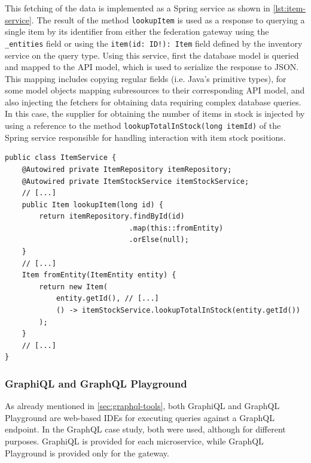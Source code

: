 This fetching of the data is implemented as a Spring service as shown in \autoref{lst:item-service}.
The result of the method \texttt{lookupItem} is used as a response to querying a single item by its identifier from either the federation gateway using the \texttt{\_entities} field or using the \texttt{item(id: ID!): Item} field defined by the inventory service on the query type.
Using this service, first the database model is queried and mapped to the \ac{API} model, which is used to serialize the response to \ac{JSON}.
This mapping includes copying regular fields (i.e. Java's primitive types), for some model objects mapping subresources to their corresponding \ac{API} model, and also injecting the fetchers for obtaining data requiring complex database queries.
In this case, the supplier for obtaining the number of items in stock is injected by using a reference to the method \texttt{lookupTotalInStock(long itemId)} of the Spring service responsible for handling interaction with item stock positions.

\begin{minipage}{\linewidth}
\begin{lstlisting}[caption={\acs{API} Model Creation with Fetcher Injection}, style=java-ext, label={lst:item-service}]
public class ItemService {
    @Autowired private ItemRepository itemRepository;
    @Autowired private ItemStockService itemStockService;
    // [...]
    public Item lookupItem(long id) {
        return itemRepository.findById(id)
                             .map(this::fromEntity)
                             .orElse(null);
    }
    // [...]
    Item fromEntity(ItemEntity entity) {
        return new Item(
            entity.getId(), // [...]
            () -> itemStockService.lookupTotalInStock(entity.getId())
        );
    }
    // [...]
}
\end{lstlisting}
\end{minipage}

\subsubsection{GraphiQL and GraphQL Playground}

As already mentioned in \autoref{sec:graphql-tools}, both GraphiQL and GraphQL Playground are web-based \acp{IDE} for executing queries against a GraphQL endpoint.
In the GraphQL case study, both were used, although for different purposes.
GraphiQL is provided for each microservice, while GraphQL Playground is provided only for the gateway.


